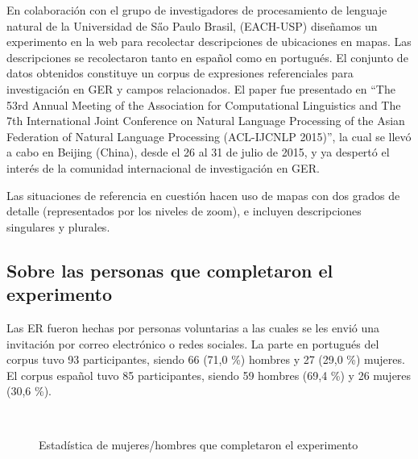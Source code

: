 En colaboraci\'on con el grupo de investigadores de procesamiento de lenguaje natural de la Universidad de S\H ao Paulo Brasil, (EACH-USP) dise\~namos un experimento en la web para recolectar descripciones de ubicaciones en mapas. Las descripciones se recolectaron tanto en espa\~nol como en portugu\'es. El conjunto de datos obtenidos constituye un corpus de expresiones referenciales para investigaci\'on en GER y campos relacionados. El paper \cite{DBLP:conf/acl/AltamiranoFPB15} fue presentado en ``The 53rd Annual Meeting of the Association for Computational Linguistics and The 7th International Joint Conference on Natural Language Processing of the Asian Federation of Natural Language Processing (ACL-IJCNLP 2015)'', la cual se llev\'o a cabo en Beijing (China), desde el 26 al 31 de julio de 2015, y ya despert\'o el inter\'es de la comunidad internacional de investigaci\'on en GER.

Las situaciones de referencia en cuesti\'on hacen uso de mapas con dos grados de detalle (representados por los niveles de zoom), e incluyen descripciones singulares y plurales.



\subsection{Sobre las personas que completaron el experimento}
\label{corpus-voluntarios}

Las ER fueron hechas por personas voluntarias a las cuales se les envi\'o una invitaci\'on por correo electr\'onico o redes sociales. La parte en portugu\'es del corpus tuvo 93 participantes, siendo 66 (71,0 \%) hombres y 27 (29,0 \%) mujeres. El corpus espa\~nol tuvo 85 participantes, siendo 59 hombres (69,4 \%) y 26 mujeres (30,6 \%).
\begin{figure}[ht]
\begin{center}
\\[0pt]
\caption{Estad\'istica de mujeres/hombres que completaron el experimento}
\label{estadistica-mf}
\end{center}
\end{figure}
